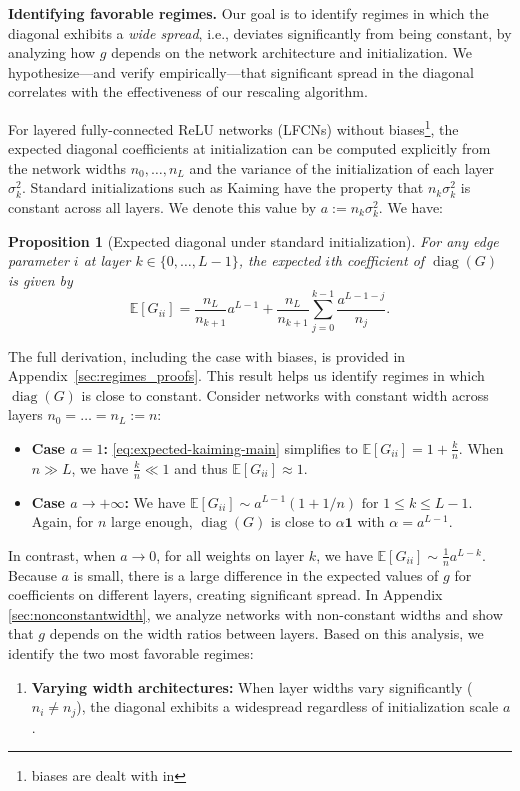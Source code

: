 \documentclass{article}
\theoremstyle{plain}
\newtheorem{proposition}[theorem]{Proposition}
\theoremstyle{definition}
\theoremstyle{remark}
\def\diag{\text{diag}}
\def\diag{\operatorname{diag}}
\begin{document}
{\textbf{Identifying favorable regimes.} Our goal is to identify regimes in which the diagonal exhibits a \emph{wide spread}, 
i.e., deviates significantly from being constant, 
by analyzing how $g$ depends on the network architecture and initialization.
We hypothesize—and verify empirically—that significant spread in the diagonal correlates with 
the effectiveness of our rescaling algorithm.

For layered fully-connected ReLU networks (LFCNs) without biases\footnote{biases are dealt with in }, the expected diagonal coefficients at initialization can be computed explicitly 
from the network widths $n_0, \ldots, n_L$ and the variance of the initialization of each layer $\sigma_k^2$. 
Standard initializations such as Kaiming \citep{he2015delving} have the property that 
$n_k \sigma_k^2$ is constant across all layers. We denote this value by $a := n_k \sigma_k^2$. We have:
\begin{proposition}[Expected diagonal under standard initialization]
\label{prop:expected-standard-init-main}
For any edge parameter $i$ at layer $k \in \{0, \ldots, L-1\}$, the expected 
$i$th coefficient of $\diag(G)$ is given by
\begin{equation}
\label{eq:expected-kaiming-main}
\mathbb{E}[G_{ii}] = \frac{n_L}{n_{k+1}} a^{L-1} + \frac{n_L}{n_{k+1}} \sum_{j=0}^{k-1} \frac{a^{L-1-j}}{n_j}.
\end{equation}
\end{proposition}
The full derivation, including the case with biases, is provided in Appendix~\ref{sec:regimes_proofs}.
This result helps us identify regimes in which $\diag(G)$ is close to constant.
Consider networks with constant width across layers
$n_0 = \ldots = n_L := n$:
\begin{itemize}
\item \textbf{Case $a = 1$:} \eqref{eq:expected-kaiming-main} simplifies to 
$\mathbb{E}[G_{ii}] = 1 + \frac{k}{n}$. When $n \gg L$, we have $\frac{k}{n} \ll 1$ 
and thus $\mathbb{E}[G_{ii}] \approx 1$.

\item \textbf{Case $a \rightarrow +\infty$:} We have 
$\mathbb{E}[G_{ii}] \sim 
a^{L-1}(1+1/n) \text{ for } 1\leq  k\leq L-1.$
Again, for $n$ large enough, $\diag(G)$ is close to $\alpha \mathbf{1}$ with 
$\alpha = a^{L-1}$.
\end{itemize}
In contrast, when $a \rightarrow 0$, for all weights on layer $k$, we have $\mathbb{E}[G_{ii}] \sim \frac{1}{n}a^{L-k}$.
Because $a$ is small, there is a large difference in the expected values of $g$ for coefficients on different layers, creating significant spread.
In Appendix \ref{sec:nonconstantwidth}, we analyze networks with non-constant widths and show that $g$ depends on the width ratios between layers.
Based on this analysis, we identify the two most favorable regimes:
\begin{enumerate}
\item \textbf{Varying width architectures:} 
When layer widths vary significantly 
($n_i \neq n_j$), the diagonal exhibits a widespread regardless of 
initialization scale $a$. 



\end{enumerate}}
\end{document}
